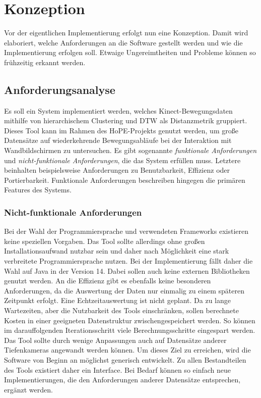 \chapter{Konzeption}
\label{chapter4}
Vor der eigentlichen Implementierung erfolgt nun eine Konzeption.
Damit wird elaboriert, welche Anforderungen an die Software gestellt werden
und wie die Implementierung erfolgen soll.
Etwaige Ungereimtheiten und Probleme können so frühzeitig erkannt werden.


\section{Anforderungsanalyse}
\label{4-Anforderungsanalyse}
Es soll ein System implementiert werden,
welches Kinect-Bewegungsdaten mithilfe von hierarchischem Clustering
und \ac{DTW} als Distanzmetrik gruppiert.
Dieses Tool kann im Rahmen des HoPE-Projekts genutzt werden,
um große Datensätze auf wiederkehrende Bewegungsabläufe bei der Interaktion mit Wandbildschirmen
zu untersuchen.
Es gibt sogenannte \emph{funktionale Anforderungen} und \emph{nicht-funktionale Anforderungen},
die das System erfüllen muss.
Letztere beinhalten beispielsweise Anforderungen zu Benutzbarkeit, Effizienz oder Portierbarkeit.
Funktionale Anforderungen beschreiben hingegen die primären Features des Systems.

\subsection{Nicht-funktionale Anforderungen}
\label{4-NichtFunktionaleAnforderungen}
Bei der Wahl der Programmiersprache und verwendeten Frameworks
existieren keine speziellen Vorgaben.
Das Tool sollte allerdings ohne großen Installationsaufwand nutzbar sein
und daher nach Möglichkeit eine stark verbreitete Programmiersprache nutzen.
Bei der Implementierung fällt daher die Wahl auf Java in der Version 14.
Dabei sollen auch keine externen Bibliotheken genutzt werden.
An die Effizienz gibt es ebenfalls keine besonderen Anforderungen,
da die Auswertung der Daten nur einmalig zu einem späteren Zeitpunkt erfolgt.
Eine Echtzeitauswertung ist nicht geplant.
Da zu lange Wartezeiten, aber die Nutzbarkeit des Tools einschränken,
sollen berechnete Kosten in einer geeigneten Datenstruktur zwischengespeichert werden.
So können im darauffolgenden Iterationsschritt viele Berechnungsschritte eingespart werden.
Das Tool sollte durch wenige Anpassungen auch auf Datensätze anderer Tiefenkameras angewandt werden können.
Um dieses Ziel zu erreichen, wird die Software von Beginn an möglichst generisch entwickelt.
Zu allen Bestandteilen des Tools existiert daher ein Interface.
Bei Bedarf können so einfach neue Implementierungen,
die den Anforderungen anderer Datensätze entsprechen, ergänzt werden.

